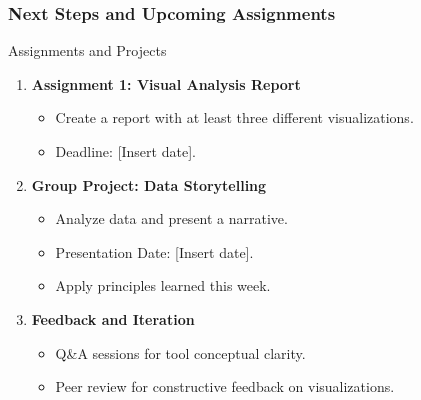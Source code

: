 \documentclass[aspectratio=169]{beamer}
\begin{document}
\begin{frame}[fragile]
    \frametitle{Next Steps and Upcoming Assignments}
    \begin{block}{Assignments and Projects}
        \begin{enumerate}
            \item \textbf{Assignment 1: Visual Analysis Report}
                \begin{itemize}
                    \item Create a report with at least three different visualizations.
                    \item Deadline: [Insert date].
                \end{itemize}
            \item \textbf{Group Project: Data Storytelling}
                \begin{itemize}
                    \item Analyze data and present a narrative.
                    \item Presentation Date: [Insert date].
                    \item Apply principles learned this week.
                \end{itemize}
            \item \textbf{Feedback and Iteration}
                \begin{itemize}
                    \item Q\&A sessions for tool conceptual clarity.
                    \item Peer review for constructive feedback on visualizations.
                \end{itemize}
        \end{enumerate}
    \end{block}
\end{frame}
\end{document}
